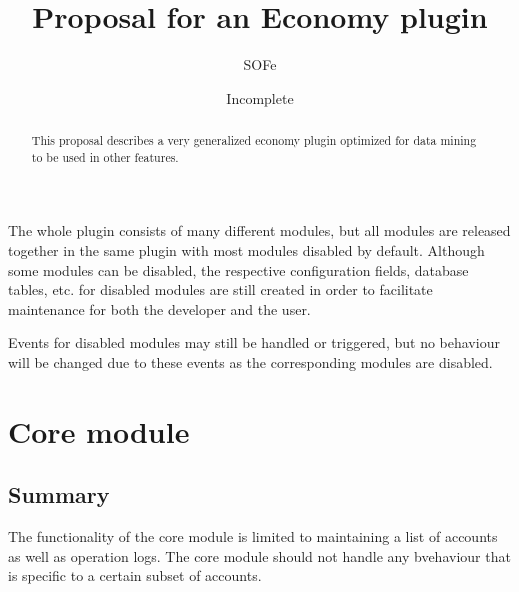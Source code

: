 \documentclass{report}
\title{Proposal for an Economy plugin}
\date{Incomplete}
\author{SOFe}
\begin{document}

	\maketitle

	\begin{abstract}
		This proposal describes a very generalized economy plugin optimized for data mining to be used in other features.
	\end{abstract}

	\setcounter{tocdepth}{5}
	\tableofcontents

	The whole plugin consists of many different modules, but all modules are released together in the same plugin with most modules disabled by default.
	Although some modules can be disabled, the respective configuration fields, database tables, etc. for disabled modules are still created
	in order to facilitate maintenance for both the developer and the user.

	Events for disabled modules may still be handled or triggered,
	but no behaviour will be changed due to these events as the corresponding modules are disabled.

	\part{Core module}
		\chapter{Summary}

			The functionality of the core module is limited to maintaining a list of accounts as well as operation logs.
			The core module should not handle any bvehaviour that is specific to a certain subset of accounts.
\end{document}
